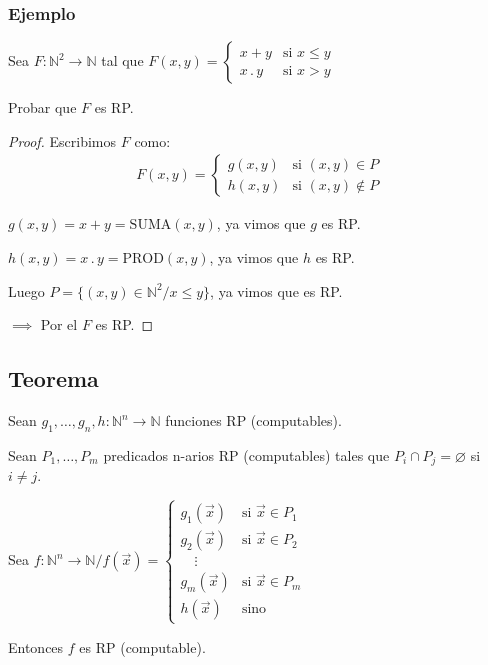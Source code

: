 \subsubsection{Ejemplo}

Sea $F: \mathbb{N}^2 \to \mathbb{N}$ tal que $F(x,y) = \begin{cases}
    x+y & \text{si } x \leq y \\
    x\, . \, y & \text{si } x > y 
\end{cases}$

Probar que $F$ es RP.

\begin{proof} \phantom{.}

    Escribimos $F$ como:
    \begin{gather*}
        F(x,y) = 
        \begin{cases}
            g(x,y) & \text{si } (x,y) \in {P}\\
            h(x,y) & \text{si } (x,y) \notin {P}
        \end{cases}
    \end{gather*}

    $g(x,y) = x+y = \mathrm{SUMA}(x, y)$, ya vimos que $g$ es RP.

    $h(x,y) = x \, . \, y = \mathrm{PROD}(x, y)$, ya vimos que $h$ es RP.

    Luego $P = \{ (x,y) \in \mathbb{N}^2 / x \leq y \}$, ya vimos que es RP.

    $\implies$ Por el  $F$ es RP.
\end{proof}

\subsection{Teorema}

\begin{teorema}{}{}
    Sean $g_1, \dotsc, g_n,h : \mathbb{N}^n \to \mathbb{N}$ funciones RP
    (computables).

    Sean $P_1, \dotsc, P_m$ predicados n-arios RP (computables) tales que
    $P_i \cap P_j = \varnothing$ si $i \neq j$.

    Sea $f: \mathbb{N}^n \to \mathbb{N} / f(\overrightarrow{x}) =
    \begin{cases}
        g_1(\overrightarrow{x}) & \text{si } \overrightarrow{x} \in P_1 \\
        g_2(\overrightarrow{x}) & \text{si } \overrightarrow{x} \in P_2 \\
        \quad \vdots & \\
        g_m(\overrightarrow{x}) & \text{si } \overrightarrow{x} \in P_m \\
        h(\overrightarrow{x}) & \text{sino}
    \end{cases}$

    \medskip

    Entonces $f$ es RP (computable).
\end{teorema}

